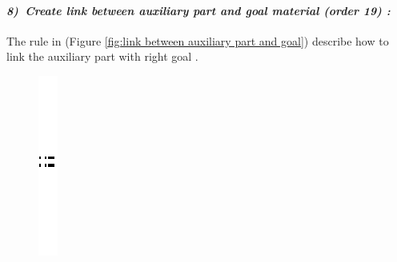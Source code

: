 \paragraph{\emph{8)~Create link between auxiliary part and  goal material  (order 19) :} }
 
 
The rule in (Figure \ref{fig:link between auxiliary part and goal})  describe 
how to link the auxiliary part with right goal .  


\begin{figure}[th]
\centering

\quad{}\quad{}
\includegraphics{Chapiter3/img/sep}
\quad{}\quad{}
 

\end{figure}
